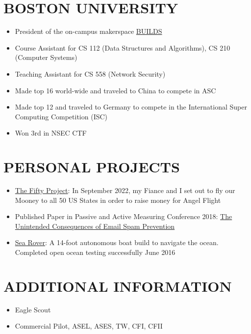 \documentclass{res}
\begin{document}
\begin{resume}
\section{BOSTON UNIVERSITY}    
	\begin{itemize}
   	\setlength\itemsep{0em}
        \item President of the on-campus makerspace \href{http://builds.cc}{BUILDS}
        \item Course Assistant for CS 112 (Data Structures and Algorithms), CS 210 (Computer Systems)
        \item Teaching Assistant for CS 558 (Network Security)
        \item Made top 16 world-wide and traveled to China to compete in ASC
        \item Made top 12 and traveled to Germany to compete in the International Super Computing Competition (ISC)
        \item Won 3rd in NSEC CTF
        \end{itemize}
\vspace{-0.10in}
\section{PERSONAL PROJECTS}    
	\begin{itemize}
   	\setlength\itemsep{0em}   
         \item \href{https://thefiftyproject.com/}{The Fifty Project}: In September 2022, my Fiance and I set out to fly our Mooney to all 50 US States in order to raise money for Angel Flight
  		 \item Published Paper in Passive and Active Measuring Conference 2018: \href{https://www.cs.huji.ac.il/~yossigi/pam18.pdf}{The Unintended Consequences of Email Spam Prevention}
         \item \href{https://www.kickstarter.com/projects/bdommie/sea-rover}{Sea Rover}: A 14-foot autonomous boat build to navigate the ocean. Completed open ocean testing successfully June 2016
    		\end{itemize}
\vspace{-0.10in}
    \section{ADDITIONAL INFORMATION} 
    	\begin{itemize}
	\setlength\itemsep{0em}
  		\item Eagle Scout  
  		\item Commercial Pilot, ASEL, ASES, TW, CFI, CFII
	\end{itemize}           
 
\end{resume}
\end{document}
